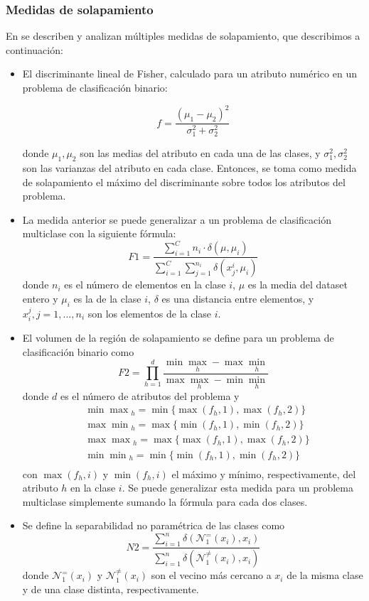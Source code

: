\documentclass[a4paper,12pt]{report}
\theoremstyle{definition}
\begin{document}
\subsubsection{Medidas de solapamiento}

En \cite{sanchez2007analysis} se describen y analizan múltiples medidas de solapamiento, que describimos a continuación:

\begin{itemize}
\item El discriminante lineal de Fisher, calculado para un atributo numérico en un problema de clasificación binario:

  $$ f = \frac{(\mu_1 - \mu_2)^2}{\sigma_1^2 + \sigma_2^2}$$

  donde $\mu_1, \mu_2$ son las medias del atributo en cada una de las clases, y $\sigma_1^2, \sigma_2^2$ son las varianzas del atributo en cada clase. Entonces, se toma como medida de solapamiento el máximo del discriminante sobre todos los atributos del problema.
\item La medida anterior se puede generalizar a un problema de clasificación multiclase con la siguiente fórmula:
  $$ F1 = \frac{\sum_{i=1}^C n_i \cdot \delta(\mu, \mu_i)}{\sum_{i=1}^C\sum_{j=1}^{n_i}\delta(x_j^i, \mu_i)} $$
  donde $n_i$ es el número de elementos en la clase $i$, $\mu$ es la media del dataset entero y $\mu_i$ es la de la clase $i$, $\delta$ es una distancia entre elementos, y $x_i^j, j = 1, \ldots, n_i$ son los elementos de la clase $i$.
\item El volumen de la región de solapamiento se define para un problema de clasificación binario como
  $$ F2 = \prod_{h=1}^d \frac{\min \max _h - \max \min _h}{\max \max _h - \min \min _h} $$
  donde $d$ es el número de atributos del problema y
  \begin{align*}
    & \min \max{}_h = \min\lbrace \max(f_h, 1), \max(f_h, 2) \rbrace \\
    & \max \min{}_h = \max\lbrace \min(f_h, 1), \min(f_h, 2) \rbrace \\
    & \max \max{}_h = \max\lbrace \max(f_h, 1), \max(f_h, 2) \rbrace \\
    & \min \min{}_h = \min\lbrace \min(f_h, 1), \min(f_h, 2) \rbrace \\
  \end{align*}
  con $\max(f_h, i)$ y $\min(f_h, i)$ el máximo y mínimo, respectivamente, del atributo $h$ en la clase $i$.
  Se puede generalizar esta medida para un problema multiclase simplemente sumando la fórmula para cada dos clases.
\item Se define la separabilidad no paramétrica de las clases como
  $$ N2 = \frac{\sum_{i=1}^n \delta(\mathcal{N}_1^=(x_i),x_i)}{\sum_{i=1}^n \delta(\mathcal{N}_1^{\neq}(x_i),x_i)}$$
  donde $\mathcal{N}_1^=(x_i)$  y $\mathcal{N}_1^{\neq}(x_i)$ son el vecino más cercano a $x_i$ de la misma clase y de una clase distinta, respectivamente.
\end{itemize}
\end{document}
